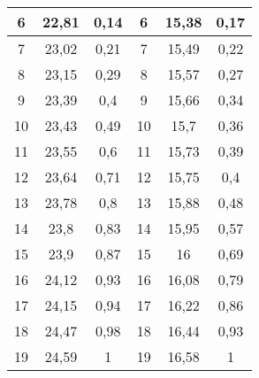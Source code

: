 \documentclass[a4paper,12pt]{extreport}
\begin{document}
\begin{enumerate}
\begin{table}[h]
\begin{tabular}{ccc||c|c|c|}
\multicolumn{1}{|c|}{6} & \multicolumn{1}{c|}{22,81} & 0,14 & 6 & 15,38 & 0,17 \\ \hline
\multicolumn{1}{|c|}{7} & \multicolumn{1}{c|}{23,02} & 0,21 & 7 & 15,49 & 0,22 \\ \hline
\multicolumn{1}{|c|}{8} & \multicolumn{1}{c|}{23,15} & 0,29 & 8 & 15,57 & 0,27 \\ \hline
\multicolumn{1}{|c|}{9} & \multicolumn{1}{c|}{23,39} & 0,4 & 9 & 15,66 & 0,34 \\ \hline
\multicolumn{1}{|c|}{10} & \multicolumn{1}{c|}{23,43} & 0,49 & 10 & 15,7 & 0,36 \\ \hline
\multicolumn{1}{|c|}{11} & \multicolumn{1}{c|}{23,55} & 0,6 & 11 & 15,73 & 0,39 \\ \hline
\multicolumn{1}{|c|}{12} & \multicolumn{1}{c|}{23,64} & 0,71 & 12 & 15,75 & 0,4 \\ \hline
\multicolumn{1}{|c|}{13} & \multicolumn{1}{c|}{23,78} & 0,8 & 13 & 15,88 & 0,48 \\ \hline
\multicolumn{1}{|c|}{14} & \multicolumn{1}{c|}{23,8} & 0,83 & 14 & 15,95 & 0,57 \\ \hline
\multicolumn{1}{|c|}{15} & \multicolumn{1}{c|}{23,9} & 0,87 & 15 & 16 & 0,69 \\ \hline
\multicolumn{1}{|c|}{16} & \multicolumn{1}{c|}{24,12} & 0,93 & 16 & 16,08 & 0,79 \\ \hline
\multicolumn{1}{|c|}{17} & \multicolumn{1}{c|}{24,15} & 0,94 & 17 & 16,22 & 0,86 \\ \hline
\multicolumn{1}{|c|}{18} & \multicolumn{1}{c|}{24,47} & 0,98 & 18 & 16,44 & 0,93 \\ \hline
\multicolumn{1}{|c|}{19} & \multicolumn{1}{c|}{24,59} & 1 & 19 & 16,58 & 1 \\ \hline

 \end{tabular}
\end{table}
\end{enumerate}
\newpage
\end{document}
